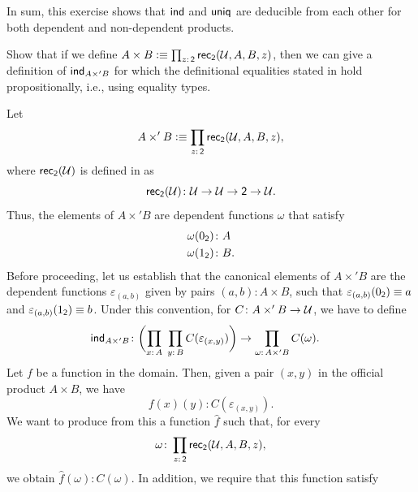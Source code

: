 \begin{solution}
    In sum, this exercise shows that $\mathsf{ind}$ and $\mathsf{uniq}$ are deducible from each other for both dependent and non-dependent products.
    
\end{solution}

\begin{exr}\fe
    Show that if we define\/ $A\times B\defeq\prod_{z\colon\fun2}\fun{rec}_{\fun2}(\univ,A,B,z)$, then we can give a definition of\/ $\mathsf{ind}_{A\times' B}$ for which the definitional equalities stated in\/ {\upshape{}} hold propositionally, i.e., using equality types.
\end{exr}

\begin{solution}
    Let
    \[
        A\times'B\defeq\prod_{z\colon\fun2}
            \fun{rec}_{\fun2}(\univ,A,B,z),
    \]
    where $\mathsf{rec}_{\mathsf{2}}(\mathcal U)$ is defined in  as
    \[
        \fun{rec}_{\fun2}(\univ)\colon
            \univ\to\univ\to\fun2\to\univ.
    \]
    Thus, the elements of $A\times'B$ are dependent functions $\omega$ that satisfy
    \begin{align*}
        \omega(0_{\fun2})&\colon A\\
        \omega(1_{\fun2})&\colon B.
    \end{align*}
    Before proceeding, let us establish that the canonical elements of $A\times'B$ are the dependent functions $\varepsilon_{(a,b)}$ given by pairs $(a,b)\colon A\times B$, such that $\varepsilon_{(a,b)}(0_{\mathsf{2}})\equiv a$ and $\varepsilon_{(a,b)}(1_{\mathsf{2}})\equiv b$. Under this convention, for $C\colon A\times'B\to\univ$, we have to define
    \begin{align*}
        \fun{ind}_{A\times'B}&\colon
            \biggl(
                \prod_{x\colon A}\;\prod_{y\colon B}
                    C(\varepsilon_{(x,y)})
            \biggr)
            \to\prod_{\omega\colon A\times'B}C(\omega).
    \end{align*}
    Let $f$ be a function in the domain. Then, given a pair $(x,y)$ in the official product $A\times B$, we have
    \[
        f(x)(y)\colon C(\varepsilon_{(x,y)}).
    \]
    We want to produce from this a function $\hat f$ such that, for every
    \[
        \omega\colon\prod_{z\colon\fun2}
            \fun{rec}_{\fun2}(\univ,A,B,z),
    \]
    we obtain $\hat f(\omega)\colon C(\omega)$. In addition, we require that this function satisfy
    \begin{equation}\label{eq:propositional-base-condition}

\end{equation}
\end{solution}
